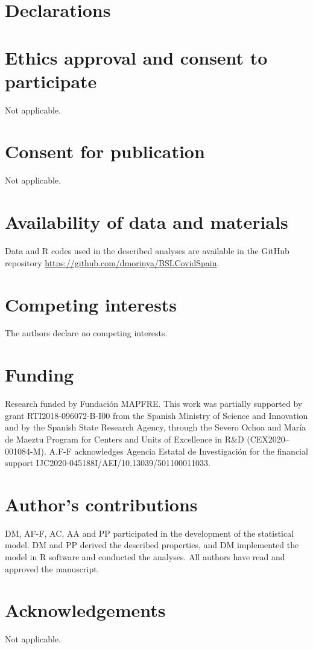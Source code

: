 \documentclass{bmcart}
\begin{document}
\section*{Declarations}
\begin{backmatter}
\section*{Ethics approval and consent to participate}
Not applicable.

\section*{Consent for publication}
Not applicable.

\section*{Availability of data and materials}
Data and R codes used in the described analyses are available in the GitHub repository \url{https://github.com/dmorinya/BSLCovidSpain}.

\section*{Competing interests}
The authors declare no competing interests.

\section*{Funding}
Research funded by Fundaci\'on MAPFRE. This work was partially supported by grant RTI2018-096072-B-I00 from the Spanish Ministry of Science and Innovation and by the Spanish State Research Agency, through the Severo Ochoa and María de Maeztu Program for Centers and Units of Excellence in R\&D (CEX2020–001084-M). A.F-F acknowledges Agencia Estatal de Investigaci\'on for the financial support IJC2020-045188I/AEI/10.13039/501100011033.

\section*{Author's contributions}
DM, AF-F, AC, AA and PP participated in the development of the statistical model. DM and PP derived the described properties, and DM implemented the model in R software and conducted the analyses. All authors have read and approved the manuscript.

\section*{Acknowledgements}
Not applicable.


\end{backmatter}
\end{document}
